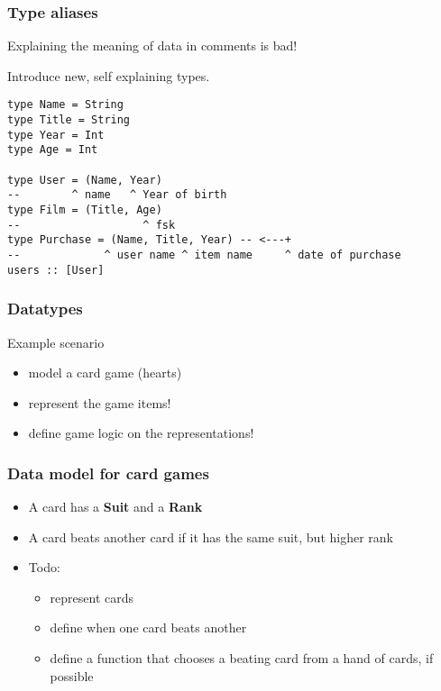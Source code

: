 \documentclass{beamer}
\subtitle{Type definitions}
\begin{document}
\begin{frame}
  \titlepage
\end{frame}
\begin{frame}
  \frametitle{Type aliases}
Explaining the meaning of data in comments is bad!

Introduce new, self explaining types.
\begin{verbatim}
type Name = String
type Title = String
type Year = Int
type Age = Int

type User = (Name, Year)
--        ^ name   ^ Year of birth 
type Film = (Title, Age)
--                   ^ fsk           
type Purchase = (Name, Title, Year) -- <---+
--             ^ user name ^ item name     ^ date of purchase
users :: [User]
\end{verbatim}
\end{frame}
\begin{frame}[fragile]
  \frametitle{Datatypes}
  \begin{block}{Example scenario}
    \begin{itemize}
    \item model a card game (hearts)
    \item represent the game items!
    \item define game logic on the representations!
    \end{itemize}
  \end{block}
\end{frame}
\begin{frame}
  \frametitle{Data model for card games}
  \begin{itemize}
  \item A card has a \textbf{Suit} and a \textbf{Rank}
  \item A card beats another card if it has the same suit, but higher rank
  \item Todo:
    \begin{itemize}
    \item represent cards
    \item define when one card beats another
    \item define a function that chooses a beating card from a hand of
      cards, if possible
    \end{itemize}
  \end{itemize}
\end{frame}
\end{document}
